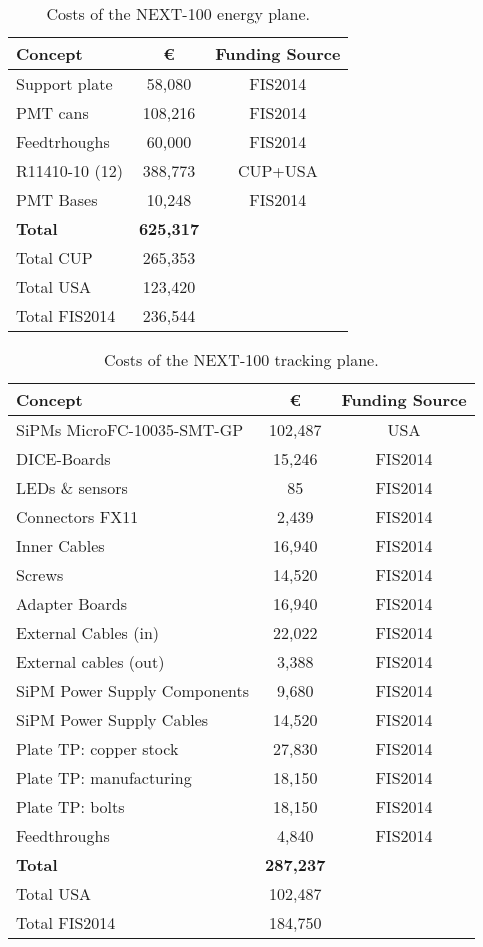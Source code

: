 \begin{table}[h!]
\begin{center}
\begin{tabular}{|l|c|c|}
\hline
 Concept & \euro & Funding Source \\
 \hline
Support plate	&	58,080 &	FIS2014 \\
PMT cans &	108,216 &	FIS2014 \\
Feedtrhoughs &	60,000 & FIS2014 \\
R11410-10 (12) &	388,773	& CUP+USA \\
PMT Bases &		10,248 &	FIS2014 \\
  \hline
{\bf Total}	&	{\bf 625,317}	& \\
Total CUP	&	265,353	&\\
Total USA	&	123,420 & \\
Total FIS2014	&	236,544 & \\	
 \hline\hline
\end{tabular}  
\caption{Costs of the NEXT-100 energy plane.}
\label{tab.n100:EP}
\end{center}
\end{table}

\begin{table}[h!]
\begin{center}
\begin{tabular}{|l|c|c|}
\hline
 Concept & \euro & Funding Source \\
 \hline
SiPMs MicroFC-10035-SMT-GP & 102,487 & USA \\
DICE-Boards &15,246 & FIS2014 \\
LEDs \& sensors &	85 & FIS2014 \\
Connectors FX11 & 2,439 & FIS2014 \\
Inner Cables & 16,940 & FIS2014 \\
Screws	& 14,520 & FIS2014 \\
Adapter Boards	 &	16,940 & FIS2014 \\
External Cables (in) &	22,022 & FIS2014 \\
External cables  (out) & 3,388 & FIS2014 \\
SiPM Power Supply Components & 9,680 & FIS2014 \\
SiPM Power Supply Cables &	14,520 & FIS2014 \\
Plate  TP:  copper stock &  27,830 & FIS2014 \\
Plate  TP:  manufacturing & 18,150 & FIS2014 \\
Plate  TP:  bolts & 	18,150 & FIS2014 \\
Feedthroughs & 4,840 & FIS2014 \\
  \hline
{\bf Total}	&	{\bf 287,237 }	& \\
  Total USA	&	102,487 	& \\
   Total FIS2014	&	184,750 	& \\
 \hline\hline
\end{tabular}  
\caption{Costs of the NEXT-100 tracking plane.}
\label{tab.n100:TP}
\end{center}
\end{table} 

